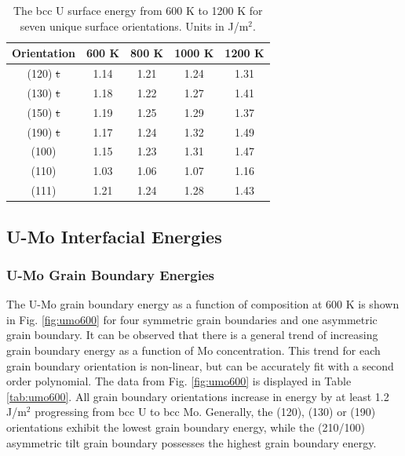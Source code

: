 \documentclass[review]{elsarticle}
\providecommand{\DIFdeltex}[1]{{\protect\color{red}\sout{#1}}}                      %
\providecommand{\DIFdelFL}[1]{\DIFdel{#1}} %
\providecommand{\DIFdelbeginFL}{} %
\providecommand{\DIFdelendFL}{} %
\providecommand{\DIFdel}[1]{\texorpdfstring{\DIFdeltex{#1}}{}} %
\newcommand{\DIFscaledelfig}{0.5}
\newlength{\DIFdelgraphicswidth} %
\newlength{\DIFdelgraphicsheight} %
\newcommand{\DIFdelincludegraphics}[2][]{%
\sbox{\DIFdelgraphicsbox}{\DIFOincludegraphics[#1]{#2}}%
\settoboxwidth{\DIFdelgraphicswidth}{\DIFdelgraphicsbox} %
\settoboxtotalheight{\DIFdelgraphicsheight}{\DIFdelgraphicsbox} %
\scalebox{\DIFscaledelfig}{%
\parbox[b]{\DIFdelgraphicswidth}{\usebox{\DIFdelgraphicsbox}\\[-\baselineskip] \rule{\DIFdelgraphicswidth}{0em}}\llap{\resizebox{\DIFdelgraphicswidth}{\DIFdelgraphicsheight}{%
\setlength{\unitlength}{\DIFdelgraphicswidth}%
\begin{picture}(1,1)%
\thicklines\linethickness{2pt} %
{\color[rgb]{1,0,0}\put(0,0){\framebox(1,1){}}}%
{\color[rgb]{1,0,0}\put(0,0){\line( 1,1){1}}}%
{\color[rgb]{1,0,0}\put(0,1){\line(1,-1){1}}}%
\end{picture}%
}\hspace*{3pt}}} %
} %
\DeclareRobustCommand{\DIFdelbeginFL}{\DIFOdelbeginFL \let\includegraphics\DIFdelincludegraphics} %
\DeclareRobustCommand{\DIFdelendFL}{\DIFOaddendFL \let\includegraphics\DIFOincludegraphics} %
\begin{document}
\begin{table}[h]
\caption{The bcc U surface energy from 600 K to 1200 K for seven unique surface orientations. Units in J/m$^{2}$. } \label{tab:usurf}
\begin{center}
\begin{tabular}{|c|c|c|c|c|}
	\hline
	Orientation & 600 K & 800 K & 1000 K & 1200 K \\
	 \hline
	 (120) \DIFdelbeginFL \DIFdelFL{t }\DIFdelendFL & 1.14 & 1.21 & 1.24 & 1.31 \\
	 (130) \DIFdelbeginFL \DIFdelFL{t }\DIFdelendFL & 1.18 & 1.22 & 1.27 & 1.41 \\
	 (150) \DIFdelbeginFL \DIFdelFL{t }\DIFdelendFL & 1.19 & 1.25 & 1.29 & 1.37 \\
	 (190) \DIFdelbeginFL \DIFdelFL{t }\DIFdelendFL & 1.17 & 1.24 & 1.32 & 1.49 \\
 (100) & 1.15 & 1.23 & 1.31 & 1.47 \\
	 (110) & 1.03 & 1.06 & 1.07 & 1.16 \\
	 (111) & 1.21 & 1.24 & 1.28 & 1.43 \\	 
	 \hline
\end{tabular}
\end{center}
\label{default}
\end{table}

\FloatBarrier

\subsection{U-Mo Interfacial Energies}
\subsubsection{U-Mo Grain Boundary Energies}

The U-Mo grain boundary energy as a function of composition at 600 K is shown in Fig. \ref{fig:umo600} for four symmetric grain boundaries and one asymmetric grain boundary. It can be observed that there is a general trend of increasing grain boundary energy as a function of Mo concentration. This trend for each grain boundary orientation is non-linear, but can be accurately fit with a second order polynomial. The data from Fig. \ref{fig:umo600} is displayed in Table \ref{tab:umo600}. All grain boundary orientations increase in energy by at least 1.2 J/m$^{2}$ progressing from bcc U to bcc Mo. Generally, the (120), (130) or (190) orientations exhibit the lowest grain boundary energy, while the (210/100) asymmetric tilt grain boundary possesses the highest grain boundary energy. 
\end{document}
